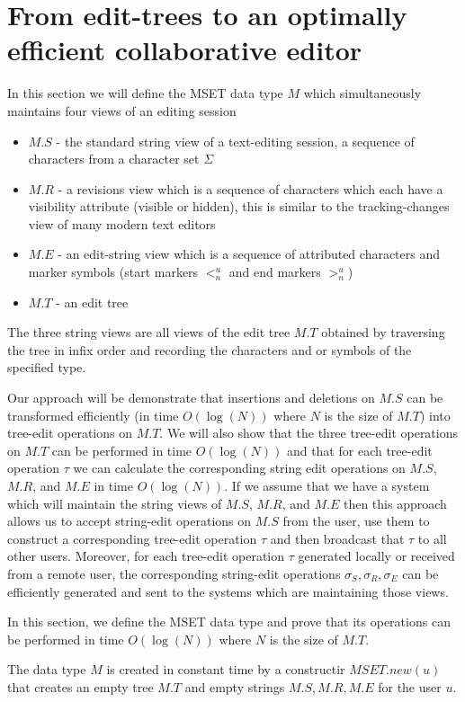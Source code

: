 \documentclass{amsart}
\begin{document}
\section{From edit-trees to an optimally efficient collaborative editor}
\label{sec:proof}
In this section we will define the MSET data type $M$ which simultaneously maintains
four views of an editing session
\begin{itemize}
\item $M.S$ - the standard string view of a text-editing session, a sequence of characters from a character set $\Sigma$
\item $M.R$ - a revisions view which is a sequence of characters which each have a visibility attribute (visible or hidden), this is similar to the tracking-changes view of many modern text editors
\item $M.E$ - an edit-string view which is a sequence of attributed characters and marker symbols (start markers $<^u_n$ and end markers $>^u_n$)
\item $M.T$ - an edit tree
\end{itemize}
The three string views are all views of the edit tree $M.T$ obtained by traversing the tree in infix order and recording the characters and or symbols of the specified type.

Our approach will be demonstrate that insertions and deletions on $M.S$ can be
transformed efficiently (in time $O(\log(N))$ where $N$ is the size of $M.T$) into
tree-edit operations on $M.T$.  We will also show that the three tree-edit operations
on $M.T$ can be performed in time $O(\log(N))$ and that for each tree-edit operation $\tau$ we can calculate the corresponding string edit operations on $M.S$, $M.R$, and $M.E$ in time $O(\log(N))$.  If we assume that we have a system which will maintain the string views of $M.S$, $M.R$, and $M.E$ then this approach allows us to accept string-edit operations on $M.S$ from the user, use them to construct a corresponding tree-edit operation $\tau$ and then broadcast that $\tau$ to all other users.  Moreover, for each tree-edit operation $\tau$ generated locally or received from a remote user, the corresponding string-edit operations $\sigma_S, \sigma_R, \sigma_E$ can be efficiently generated and sent to the systems which are maintaining those views.

In this section, we define the MSET data type and prove that its operations can be performed in time $O(\log(N))$ where $N$ is the size of $M.T$.

The data type $M$ is created in constant time by a constructir $MSET.new(u)$ that creates an empty tree $M.T$ and empty strings $M.S, M.R, M.E$ for the user $u$.
\end{document}
